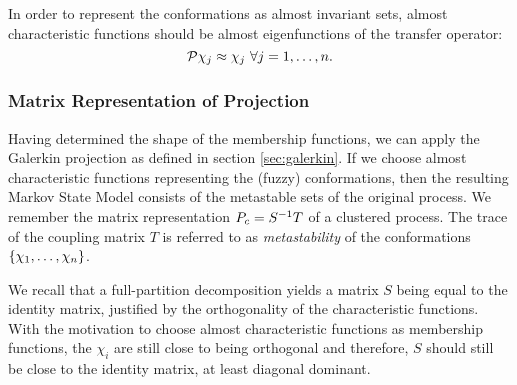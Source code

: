 In order to represent the conformations as almost invariant sets, almost characteristic functions should be almost eigenfunctions of the transfer operator:
\begin{equation*}
\mathcal{P} \chi_j \approx \chi_j \ \forall j=1,\dots,n.
\end{equation*}

\subsubsection*{Matrix Representation of Projection} %

Having determined the shape of the membership functions, we can apply the Galerkin projection as defined in section \ref{sec:galerkin}.
If we choose almost characteristic functions representing the (fuzzy) conformations, then the resulting Markov State Model consists of the metastable sets of the original process.
We remember the matrix representation $P_c = S^{-1} T$ of a clustered process.
The trace of the coupling matrix $T$ is referred to as \textit{metastability} of the conformations $\{\chi_1,\dots,\chi_n\}$.

We recall that a full-partition decomposition yields a matrix $S$ being equal to the identity matrix, justified by the orthogonality of the characteristic functions. With the motivation to choose almost characteristic functions as membership functions, the $\chi_i$ are still close to being orthogonal and therefore, $S$ should still be close to the identity matrix, at least diagonal dominant. 

